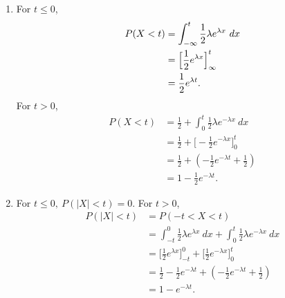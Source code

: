\documentclass{article}
\begin{document}
\begin{enumerate}
\begin{enumerate}
        \item For $t \leq 0$, 
        \begin{align*}
            P(X < t) 
            &= \int_{-\infty}^{t} \frac{1}{2}\lambda e^{\lambda x} \ dx \\
            &= \Big[ \frac{1}{2}e^{\lambda x} \Big]_{\-\infty}^{t} \\
            &= \frac{1}{2}e^{\lambda t}.
        \end{align*}
        For $t > 0$,
        \begin{align*}
            P (X < t) 
            &= \frac{1}{2} + \int_{0}^{t} \frac{1}{2}\lambda e^{-\lambda x} \ dx \\
            &= \frac{1}{2} + \Big[ -\frac{1}{2}e^{-\lambda x} \Big]_{0}^{t} \\
            &= \frac{1}{2} + (-\frac{1}{2}e^{-\lambda t} + \frac{1}{2}) \\
            &= 1 - \frac{1}{2}e^{-\lambda t}.
        \end{align*}

        \item For $t \leq 0, \ P(|X| < t) = 0$. For $t > 0$,
        \begin{align*}
            P(|X| < t)
            &= P(-t < X < t) \\
            &= \int_{-t}^{0} \frac{1}{2}\lambda e^{\lambda x} \ dx 
            + \int_{0}^{t} \frac{1}{2}\lambda e^{-\lambda x} \ dx \\
            &= \Big[ \frac{1}{2}e^{\lambda x} \Big]_{-t}^{0} + \Big[ \frac{1}{2}e^{-\lambda x} 
            \Big]_{0}^{t} \\
            &= \frac{1}{2} - \frac{1}{2}e^{-\lambda t} + (-\frac{1}{2}e^{-\lambda t} + \frac{1}{2}) \\
            &= 1 - e^{-\lambda t}.
        \end{align*}
    \end{enumerate}


\end{enumerate}
\end{document}
